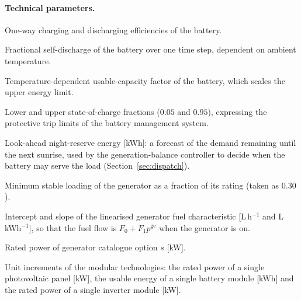 \documentclass[11pt,a4paper]{article}
\theoremstyle{plain}
\theoremstyle{definition}
\begin{document}
\paragraph{Technical parameters.}
\begin{description}[leftmargin=3.0cm,style=nextline]
  \item[$H^{\mathrm{c}},\ H^{\mathrm{d}}$] One-way charging and discharging
  efficiencies of the battery.
  \item[$A_{n,t,h}$] Fractional self-discharge of the battery over one time step,
  dependent on ambient temperature.
  \item[{$F^{e}_{n,t,h}\in(0,1]$}] Temperature-dependent usable-capacity factor of the
  battery, which scales the upper energy limit.
  \item[$\underline{E},\ \overline{E}$] Lower and upper state-of-charge fractions
  ($0.05$ and $0.95$), expressing the protective trip limits of the battery management
  system.
  \item[$R_{n,t,h}$] Look-ahead night-reserve energy [kWh]: a forecast of the demand
  remaining until the next sunrise, used by the generation-balance controller to decide
  when the battery may serve the load (Section~\ref{sec:dispatch}).
  \item[$F^{\mathrm{ge}}$] Minimum stable loading of the generator as a fraction of
  its rating (taken as $0.30$).
  \item[$F_0,\ F_1$] Intercept and slope of the linearised generator fuel
  characteristic [L\,h$^{-1}$ and L\,kWh$^{-1}$], so that the fuel flow is
  $F_0+F_1 p^{\mathrm{ge}}$ when the generator is on.
  \item[$K^{\mathrm{ge}}_s$] Rated power of generator catalogue option $s$ [kW].
  \item[$U^{\mathrm{pv}},\ U^{\mathrm{batt}},\ U^{\mathrm{inv}}$] Unit increments of the
  modular technologies: the rated power of a single photovoltaic panel [kW], the usable
  energy of a single battery module [kWh] and the rated power of a single inverter module
  [kW].
\end{description}
\end{document}
